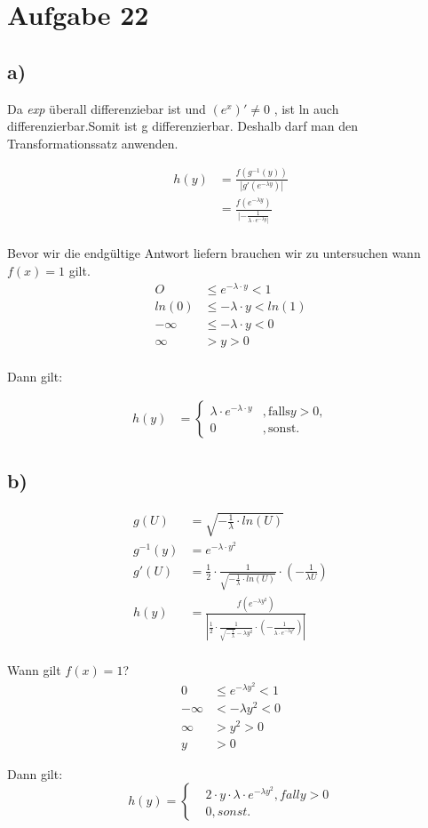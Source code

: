 \documentclass{article}
\begin{document}
	\section*{Aufgabe 22}

	\subsection*{a)}
		Da \textit{exp} überall differenziebar ist und $(e^x)' \neq 0 $ , ist ln auch differenzierbar.Somit ist g differenzierbar. Deshalb darf man den Transformationssatz anwenden.

		\begin{align*}
			h(y) &= \frac{f(g^{-1}(y))}{|g'(e^{-\lambda y})|} \\
			&= \frac{f(e^{-\lambda y})}{|-\frac{1}{\lambda \cdot e^{-\lambda y}|}}\\
		\end{align*}
		
		Bevor wir die endgültige Antwort liefern brauchen wir zu untersuchen wann $f(x) = 1$ gilt.
		\begin{align*}
			O &\leq e^{-\lambda \cdot y} < 1\\
			ln(0) &\leq -\lambda \cdot y < ln(1)\\
			-\infty &\leq -\lambda \cdot y < 0\\
			\infty &> y > 0\\
		\end{align*}

		Dann gilt:

		\begin{align*}
			h(y) &= 
			\begin{cases}
				\lambda \cdot e^{-\lambda \cdot y} &, \text{falls} y > 0,\\
				0 &, \text{sonst}.
			\end{cases} 
		\end{align*}

	\subsection*{b)}

	\begin{align*}
		g(U) &= \sqrt{-\frac{1}{\lambda}\cdot ln(U)}\\
		g^{-1}(y) &= e^{-\lambda \cdot y^2} \\
		g'(U) &= \frac{1}{2}\cdot\frac{1}{\sqrt{-\frac{1}{\lambda}\cdot ln(U)}} \cdot (-\frac{1}{\lambda U})\\
		h(y) &= \frac{f(e^{-\lambda y^2})}{|\frac{1}{2} \cdot \frac{1}{\sqrt{-\frac{1}{\lambda}}-\lambda y^2} \cdot (-\frac{1}{\lambda \cdot e^{-\lambda y^2}})|}\\
	\end{align*}

	Wann gilt $f(x) = 1 $?
	\begin{align*}
		0 &\leq e^{-\lambda y^2} < 1\\
		-\infty &< -\lambda y^2 < 0 \\
		\infty &> y^2 > 0\\
		y &> 0
	\end{align*}

	Dann gilt:
	\[
		h(y) = \begin{cases}
			&2\cdot y \cdot \lambda \cdot e^{-\lambda y^2} , fall y > 0\\
			& 0 , sonst. 
		\end{cases}
	\]
\end{document}
